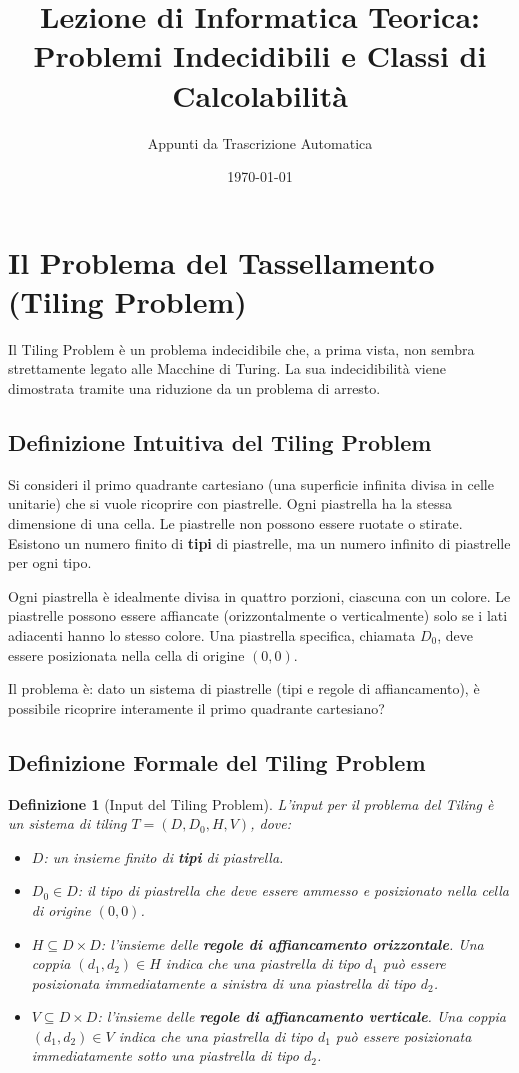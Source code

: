 \documentclass[a4paper]{article}
\title{Lezione di Informatica Teorica: \\ Problemi Indecidibili e Classi di Calcolabilit\`a}
\author{Appunti da Trascrizione Automatica}
\date{\today}
\newtheorem{definition}{Definizione}
\begin{document}
\maketitle
\tableofcontents
\newpage

\section{Il Problema del Tassellamento (Tiling Problem)}

Il Tiling Problem è un problema indecidibile che, a prima vista, non sembra strettamente legato alle Macchine di Turing. La sua indecidibilità viene dimostrata tramite una riduzione da un problema di arresto.

\subsection{Definizione Intuitiva del Tiling Problem}
Si consideri il primo quadrante cartesiano (una superficie infinita divisa in celle unitarie) che si vuole ricoprire con piastrelle. Ogni piastrella ha la stessa dimensione di una cella.
Le piastrelle non possono essere ruotate o stirate. Esistono un numero finito di \textbf{tipi} di piastrelle, ma un numero infinito di piastrelle per ogni tipo.

Ogni piastrella è idealmente divisa in quattro porzioni, ciascuna con un colore. Le piastrelle possono essere affiancate (orizzontalmente o verticalmente) solo se i lati adiacenti hanno lo stesso colore.
Una piastrella specifica, chiamata $D_0$, deve essere posizionata nella cella di origine $(0,0)$.

Il problema è: dato un sistema di piastrelle (tipi e regole di affiancamento), è possibile ricoprire interamente il primo quadrante cartesiano?

\subsection{Definizione Formale del Tiling Problem}
\begin{definition}[Input del Tiling Problem]
L'input per il problema del Tiling è un sistema di tiling $T = (D, D_0, H, V)$, dove:
\begin{itemize}
    \item $D$: un insieme finito di \textbf{tipi} di piastrella.
    \item $D_0 \in D$: il tipo di piastrella che deve essere ammesso e posizionato nella cella di origine $(0,0)$.
    \item $H \subseteq D \times D$: l'insieme delle \textbf{regole di affiancamento orizzontale}. Una coppia $(d_1, d_2) \in H$ indica che una piastrella di tipo $d_1$ può essere posizionata immediatamente a sinistra di una piastrella di tipo $d_2$.
    \item $V \subseteq D \times D$: l'insieme delle \textbf{regole di affiancamento verticale}. Una coppia $(d_1, d_2) \in V$ indica che una piastrella di tipo $d_1$ può essere posizionata immediatamente sotto una piastrella di tipo $d_2$.
\end{itemize}
\end{definition}
\end{document}
